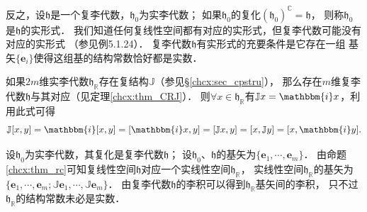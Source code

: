 反之，设$\mathfrak{h}$是一个复李代数，$\mathfrak{h}_{0}$为实李代数；
如果$\mathfrak{h}_{0}$的复化$(\mathfrak{h}_{0})^{\mathbb{C}}=\mathfrak{h}$，
则称$\mathfrak{h}_{0}$是$\mathfrak{h}$的{\heiti 实形式}．
我们知道任何复线性空间都有对应的实形式，但复李代数可能没有对应的实形式
（参见\parencite[p.88]{Hilgert-2012}例5.1.24）．
复李代数$\mathfrak{h}$有实形式的充要条件是它存在一组
基矢$\{\boldsymbol{e}_i\}$使得这组基的结构常数恰好都是实数．

如果$2m$维实李代数$\mathfrak{h}_{\mathbb{R}}$存在复结构$\mathbb{J}$（参见\S\ref{chcx:sec_cpstru}），
那么存在$m$维复李代数$\mathfrak{h}$与其对应（见定理\ref{chcx:thm_CRJ}）．
则$\forall x \in \mathfrak{h}_{\mathbb{R}}$有$\mathbb{J} x = \mathbbm{i}x$，利用此式可得
\begin{equation}
    \mathbb{J}[x,y]= \mathbbm{i} [x,y]=[\mathbbm{i} x,y]=[\mathbb{J}x,y]=[x,\mathbb{J}y]=[x,\mathbbm{i}y].
\end{equation}



设$\mathfrak{h}_{0}$为实李代数，其复化是复李代数$\mathfrak{h}$；
设$\mathfrak{h}_{0}$、$\mathfrak{h}$的基矢为$\{\boldsymbol{e}_1,\cdots,\boldsymbol{e}_m\}$．
由命题\ref{chcx:thm_rc}可知复线性空间$\mathfrak{h}$对应一个实线性空间$\mathfrak{h}_{\mathbb{R}}$，
实线性空间$\mathfrak{h}_{\mathbb{R}}$的基矢为$\{\boldsymbol{e}_1,\cdots,\boldsymbol{e}_m;
\mathbb{J}\boldsymbol{e}_1,\cdots,\mathbb{J}\boldsymbol{e}_m\}$．
由复李代数$\mathfrak{h}$的李积可以得到$\mathfrak{h}_{\mathbb{R}}$基矢间的李积，
只不过$\mathfrak{h}_{\mathbb{R}}$的结构常数未必是实数．

